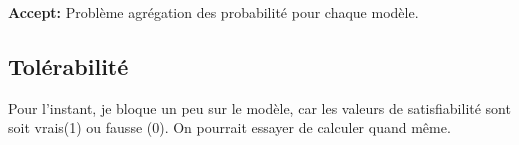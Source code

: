 \documentclass{llncs}
\begin{document}
		\textbf{Accept: } Problème agrégation des probabilité pour chaque modèle.
%	
	\subsection{Tolérabilité}
	Pour l'instant, je bloque un peu sur le modèle, car les valeurs de satisfiabilité sont soit vrais(1) ou fausse (0). 
	On pourrait essayer de calculer quand même.
	
	
\end{document}
